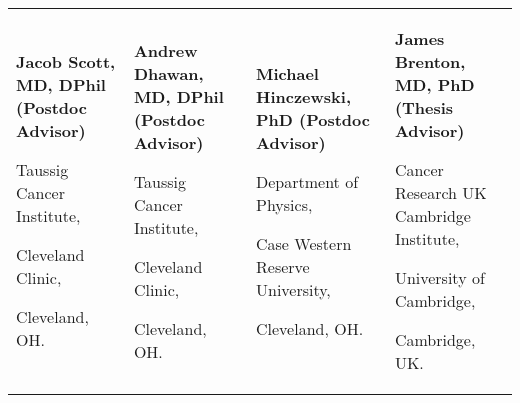 
%
\begin{tabularx}{\textwidth}{@{}X X@{}}
\textbf{Jacob Scott, MD, DPhil (Postdoc Advisor)}\par
Taussig Cancer Institute,\par
Cleveland Clinic,\par
Cleveland, OH.\par 
{}
&

\textbf{Andrew Dhawan, MD, DPhil (Postdoc Advisor)}\par
Taussig Cancer Institute,\par
Cleveland Clinic,\par
Cleveland, OH.\par 
{}
%
& 
\textbf{Michael Hinczewski, PhD (Postdoc Advisor)}\par
Department of Physics,\par
Case Western Reserve University,\par
Cleveland, OH.\par 
{}

& 
%
\textbf{James Brenton, MD, PhD (Thesis Advisor)}\par
Cancer Research UK Cambridge Institute, \par
University of Cambridge,\par 
Cambridge, UK.\par 
{}
%

\\

\end{tabularx}
